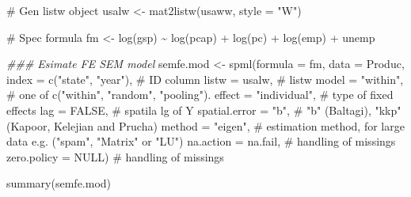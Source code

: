 \documentclass[
  letterpaper,
  DIV=11,
  numbers=noendperiod]{scrreprt}
\newenvironment{Shaded}{\begin{snugshade}}{\end{snugshade}}
\newcommand{\AttributeTok}[1]{\textcolor[rgb]{0.40,0.45,0.13}{#1}}
\newcommand{\CommentTok}[1]{\textcolor[rgb]{0.37,0.37,0.37}{#1}}
\newcommand{\ConstantTok}[1]{\textcolor[rgb]{0.56,0.35,0.01}{#1}}
\newcommand{\DocumentationTok}[1]{\textcolor[rgb]{0.37,0.37,0.37}{\textit{#1}}}
\newcommand{\FunctionTok}[1]{\textcolor[rgb]{0.28,0.35,0.67}{#1}}
\newcommand{\NormalTok}[1]{\textcolor[rgb]{0.00,0.23,0.31}{#1}}
\newcommand{\OtherTok}[1]{\textcolor[rgb]{0.00,0.23,0.31}{#1}}
\newcommand{\SpecialCharTok}[1]{\textcolor[rgb]{0.37,0.37,0.37}{#1}}
\newcommand{\StringTok}[1]{\textcolor[rgb]{0.13,0.47,0.30}{#1}}
\begin{document}
\begin{Shaded}
\begin{Highlighting}[]
\CommentTok{\# Gen listw object}
\NormalTok{usalw }\OtherTok{\textless{}{-}} \FunctionTok{mat2listw}\NormalTok{(usaww, }\AttributeTok{style =} \StringTok{"W"}\NormalTok{)}

\CommentTok{\# Spec formula}
\NormalTok{fm }\OtherTok{\textless{}{-}} \FunctionTok{log}\NormalTok{(gsp) }\SpecialCharTok{\textasciitilde{}} \FunctionTok{log}\NormalTok{(pcap) }\SpecialCharTok{+} \FunctionTok{log}\NormalTok{(pc) }\SpecialCharTok{+} \FunctionTok{log}\NormalTok{(emp) }\SpecialCharTok{+}\NormalTok{ unemp}

\DocumentationTok{\#\#\# Esimate FE SEM model}
\NormalTok{semfe.mod }\OtherTok{\textless{}{-}} \FunctionTok{spml}\NormalTok{(}\AttributeTok{formula =}\NormalTok{ fm, }\AttributeTok{data =}\NormalTok{ Produc, }
                  \AttributeTok{index =} \FunctionTok{c}\NormalTok{(}\StringTok{"state"}\NormalTok{, }\StringTok{"year"}\NormalTok{),  }\CommentTok{\# ID column}
                  \AttributeTok{listw =}\NormalTok{ usalw,          }\CommentTok{\# listw}
                  \AttributeTok{model =} \StringTok{"within"}\NormalTok{,       }\CommentTok{\# one of c("within", "random", "pooling").}
                  \AttributeTok{effect =} \StringTok{"individual"}\NormalTok{,  }\CommentTok{\# type of fixed effects}
                  \AttributeTok{lag =} \ConstantTok{FALSE}\NormalTok{,            }\CommentTok{\# spatila lg of Y}
                  \AttributeTok{spatial.error =} \StringTok{"b"}\NormalTok{,    }\CommentTok{\# "b" (Baltagi), "kkp" (Kapoor, Kelejian and Prucha)}
                  \AttributeTok{method =} \StringTok{"eigen"}\NormalTok{,       }\CommentTok{\# estimation method, for large data e.g. ("spam", "Matrix" or "LU")}
                  \AttributeTok{na.action =}\NormalTok{ na.fail,    }\CommentTok{\# handling of missings}
                  \AttributeTok{zero.policy =} \ConstantTok{NULL}\NormalTok{)     }\CommentTok{\# handling of missings}

\FunctionTok{summary}\NormalTok{(semfe.mod)}
\end{Highlighting}
\end{Shaded}
\end{document}
